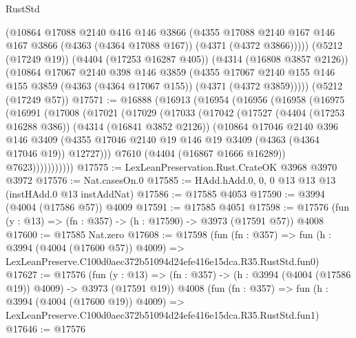 \begin{lexlean}{RustStd}
\begin{coremodule}
        (@10864
          @17088
          @2140
          @416
          @146
          @3866
          (@4355
            @17088
            @2140
            @167
            @146
            @167
            @3866
            (@4363 (@4364 @17088 @167))
            (@4371 (@4372 @3866)))))
      (@5212 (@17249 @19))
      (@4404 (@17253 @16287 @405))
      (@4314 (@16808 @3857 @2126))
      (@10864
        @17067
        @2140
        @398
        @146
        @3859
        (@4355
          @17067
          @2140
          @155
          @146
          @155
          @3859
          (@4363 (@4364 @17067 @155))
          (@4371 (@4372 @3859)))))
    (@5212 (@17249 @57))
@17571 := @16888
    (@16913
      (@16954
        (@16956
          (@16958
            (@16975
              (@16991
                (@17008
                  (@17021
                    (@17029
                      (@17033
                        (@17042
                          (@17527
                            (@4404 (@17253 @16288 @386))
                            (@4314 (@16841 @3852 @2126))
                            (@10864
                              @17046
                              @2140
                              @396
                              @146
                              @3409
                              (@4355
                                @17046
                                @2140
                                @19
                                @146
                                @19
                                @3409
                                (@4363 (@4364 @17046 @19))
                                @12727)))
                          @7610
                          (@4404 (@16867 @1666 @16289))
                          @7623)))))))))))
@17575 := LexLeanPreservation.Rust.CrateOK @3968 @3970 @3972
@17576 := Nat.casesOn.{0}
@17585 := HAdd.hAdd.{0, 0, 0} @13 @13 @13 (instHAdd.{0} @13 instAddNat)
@17586 := @17585 @4053
@17590 := @3994 (@4004 (@17586 @57)) @4009
@17591 := @17585 @4051
@17598 := @17576 (fun (y : @13) => (fn : @357) -> (h : @17590) -> @3973 (@17591 @57)) @4008
@17600 := @17585 Nat.zero
@17608 := @17598
    (fun (fn : @357) =>
    fun (h : @3994 (@4004 (@17600 @57)) @4009) =>
    LexLeanPreserve.C100d0aec372b51094d24efe416e15dca.R35.RustStd.fun0)
@17627 := @17576
    (fun (y : @13) => (fn : @357) -> (h : @3994 (@4004 (@17586 @19)) @4009) -> @3973 (@17591 @19))
    @4008
    (fun (fn : @357) =>
    fun (h : @3994 (@4004 (@17600 @19)) @4009) =>
    LexLeanPreserve.C100d0aec372b51094d24efe416e15dca.R35.RustStd.fun1)
@17646 := @17576

\end{coremodule}
\end{lexlean}

